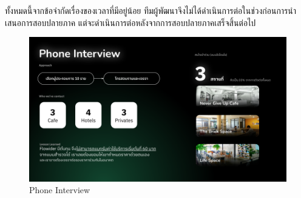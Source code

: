ทั้งหมดนี้จากข้อจำกัดเรื่องของเวลาที่มีอยู่น้อย ทีมผู้พัฒนาจึงไม่ได้ดำเนินการต่อในช่วงก่อนการนำเสนอการสอบปลายภาค แต่จะดำเนินการต่อหลังจากการสอบปลายภาคเสร็จสิ้นต่อไป
\begin{figure}[h]
    \begin{center}
    \includegraphics[width=\linewidth]{./image/Phone_interview.png}
    \end{center}
    \caption[Phone Interview]{Phone Interview}
    \label{fig:Phone_interview}
\end{figure}
